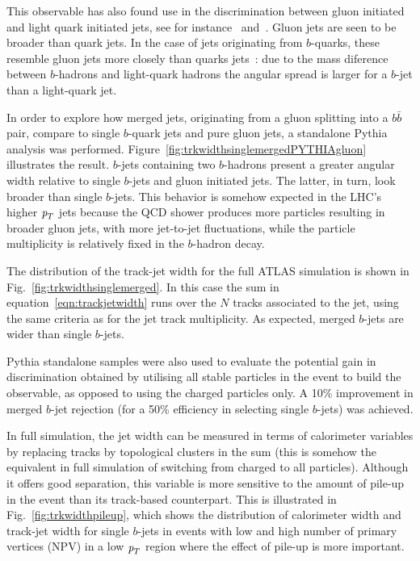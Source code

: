 This observable has also found use in the discrimination between gluon initiated and light quark initiated jets, see for instance~\cite{PhysRevLett.107.172001} and~\cite{ATLAS-CONF-2011-053}. Gluon jets are seen to be broader than quark jets. In the case of jets originating from $b$-quarks, these resemble gluon jets more closely than quarks jets~\cite{Buskulic1996353}: due to the %
mass diference between $b$-hadrons and light-quark hadrons the angular spread is larger for a $b$-jet than a light-quark jet. 

In order to explore how merged jets, originating from a gluon splitting into a $b\bar{b}$ pair, compare to single $b$-quark jets and pure gluon jets,  a standalone {\sc Pythia} analysis was performed.  Figure~\ref{fig:trkwidthsinglemergedPYTHIAgluon} illustrates the result. $b$-jets containing two $b$-hadrons present a greater angular width relative to single $b$-jets and gluon initiated jets. The latter, in turn, look broader than single $b$-jets. This behavior is somehow expected in the LHC's higher ${\emph{p}_{T}}$ jets because the QCD shower produces more particles resulting in broader gluon jets, with more jet-to-jet fluctuations, while the particle multiplicity is relatively fixed in the $b$-hadron decay.

The distribution of the track-jet width for the full ATLAS simulation is shown in Fig.~\ref{fig:trkwidthsinglemerged}. In this case %
the sum in equation~\ref{eqn:trackjetwidth} runs over the $N$ tracks associated to the jet, using the same criteria as for the jet track multiplicity. As expected, merged $b$-jets are wider than single $b$-jets. 

{\sc Pythia} standalone samples were also used to evaluate the potential gain in discrimination obtained by utilising all stable particles in the event to build the observable, as opposed to using the charged particles only.  A 10\% %
 improvement in merged $b$-jet rejection (for a 50\% efficiency in selecting single $b$-jets) was achieved.

In full simulation, the jet width can be measured in terms of calorimeter variables by replacing tracks by topological clusters in the sum (this is somehow the equivalent in full simulation of switching from charged to all particles).  Although it offers good separation, this variable is more sensitive to the amount of pile-up in the event than its track-based counterpart. This is illustrated in Fig.~\ref{fig:trkwidthpileup}, which shows the distribution of calorimeter width and track-jet width for single $b$-jets in events with low and high number of primary vertices (NPV) in a low ${\emph{p}_{T}}$ region where the effect of pile-up is more important. 

